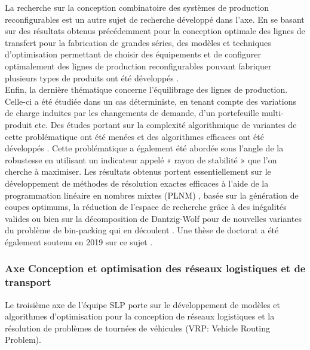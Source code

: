 La recherche sur la conception combinatoire des systèmes de production reconfigurables est un autre sujet de recherche développé dans l’axe. En se basant sur des résultats obtenus précédemment pour la conception optimale des lignes de transfert pour la fabrication de grandes séries, des modèles et techniques d'optimisation permettant de choisir des équipements et de configurer optimalement des lignes de production reconfigurables pouvant fabriquer plusieurs types de produits ont été développés \cite{Battaia2020,battaia:hal-01435089,battaia:hal-01523726,Dolgui2019,Dolgui2020, Yelles-Chaouche2020}. \\

Enfin, la dernière thématique concerne l’équilibrage des lignes de production. Celle-ci a été étudiée dans un cas déterministe, en tenant compte des variations de charge induites par les changements de demande, d’un portefeuille multi-produit etc. Des études portant sur la complexité algorithmique de variantes de cette problématique ont été menées et des algorithmes efficaces ont été développés \cite{delorme:emse-01840007,dolgui:hal-01688688}. Cette problématique a également été abordée sous l’angle de la robustesse en utilisant un indicateur appelé « rayon de stabilité » que l’on cherche à maximiser. Les résultats obtenus portent essentiellement sur le développement de méthodes de résolution exactes efficaces à l’aide de la programmation linéaire en nombres mixtes (PLNM) \cite{Rossi2016}, basée sur la génération de coupes optimums, la réduction de l’espace de recherche grâce à des inégalités valides \cite{Pirogov2017,Pirogov2018a,Pirogov2018b} ou bien sur la décomposition de Dantzig-Wolf pour de nouvelles variantes du problème de bin-packing qui en découlent \cite{Schpler2017a,Schpler2017b,Schpler2020}. Une thèse de doctorat a été également soutenu en 2019 sur ce sujet \cite{Pirogov2019}.
  

  \subsubsection{Axe Conception et optimisation des réseaux logistiques et de transport}
  		
   
Le troisième axe de l'équipe SLP porte sur le développement de modèles et algorithmes d'optimisation pour la conception de réseaux logistiques et la résolution de problèmes de tournées de véhicules (VRP: Vehicle Routing Problem).\\

